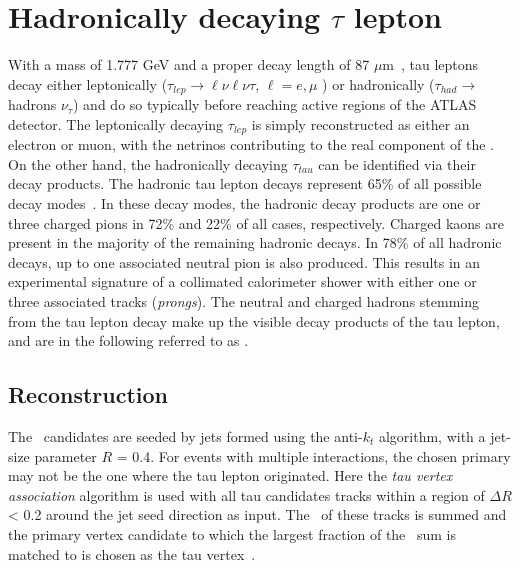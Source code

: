\large

\section{Hadronically decaying $\tau$ lepton}
\label{sec:rec:tau}
With a mass of 1.777 GeV and a proper decay length
of 87 $\mu$m~\cite{PDG}, tau leptons decay either leptonically
($\tau_{lep} \rightarrow \ell \nu \ell \nu \tau$, $\ell  = e, \mu$ ) 
or hadronically ($\tau_{had} \rightarrow$ hadrons $\nu_{\tau}$) 
and do so typically before reaching active
regions of the \hbox{ATLAS} detector. 
The leptonically decaying $\tau_{lep}$ is simply reconstructed
as either an electron or muon, with the netrinos contributing 
to the real component of the \met. 
On the other hand, the hadronically decaying $\tau_{tau}$ 
can be identified via their decay products. 
The hadronic tau lepton decays represent 65\% of all possible decay modes~\cite{PDG}. 
In these decay modes, the hadronic decay products are 
one or three charged pions in 72\% and 22\% of all cases, respectively. 
Charged kaons are present in the 
majority of the remaining hadronic decays. 
In 78\% of all hadronic decays, up to one associated neutral pion is
also produced. 
This results in an experimental signature of a collimated
calorimeter shower with either one or three associated tracks (\textit{prongs}).
The neutral and charged hadrons stemming from 
the tau lepton decay make up the visible
decay products of the tau lepton, 
and are in the following referred to as \tauhadvis.

\subsection{Reconstruction}
The \tauhadvis\ candidates are
seeded by jets formed using the anti-$k_t$ algorithm,
with a jet-size parameter $R$ = 0.4. 
For events with multiple interactions, the chosen primary may not be the
one where the tau lepton originated. 
Here the \textit{tau vertex association} algorithm is used with 
all tau candidates tracks within a region of $\Delta R$ < 0.2 
around the jet seed direction as input. 
The \pt\ of these tracks is summed and the 
primary vertex candidate to which the largest fraction
of the \pt\ sum is matched to is chosen as the tau vertex~\cite{ATLAS-CONF-2014-018}.

